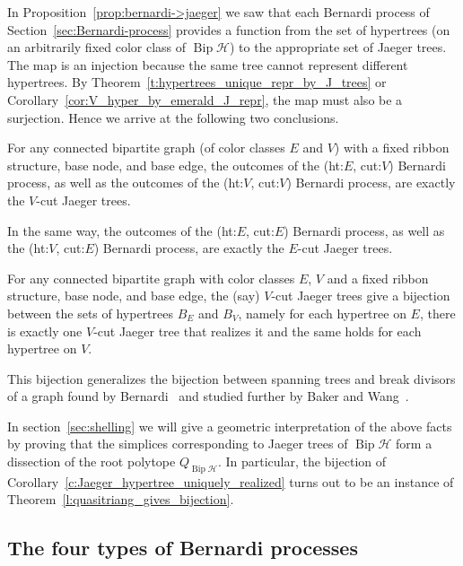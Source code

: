 \documentclass[ALCO,ThmDefs,Unicode,epreuves]{cedram}
\newcommand{\HH}{\mathcal H}
\DeclareMathOperator{\bip}{Bip}
\begin{document}
In Proposition~\ref{prop:bernardi->jaeger} we saw that each Bernardi process of Section~\ref{sec:Bernardi-process} provides a function from the set of hypertrees (on an arbitrarily fixed color class of $\bip\HH$) to the appropriate set of Jaeger trees. The map is an injection because the same tree cannot represent different hypertrees. By Theorem~\ref{t:hypertrees_unique_repr_by_J_trees} or Corollary~\ref{cor:V_hyper_by_emerald_J_repr}, the map must also be a surjection. Hence we arrive at the following two conclusions.

\begin{theo}\label{t:J-trees_are_B-trees}
For any connected bipartite graph (of color classes $E$ and $V$) with a fixed ribbon structure, base node, and base edge, the outcomes of the (ht:$E$, cut:$V$) Bernardi process, as well as the outcomes of the (ht:$V$, cut:$V$) Bernardi process, are exactly the $V$-cut Jaeger trees.
	
In the same way, the outcomes of the (ht:$E$, cut:$E$) Bernardi process, as well as the (ht:$V$, cut:$E$) Bernardi process, are exactly the $E$-cut Jaeger trees.
\end{theo}

\begin{coro} 
\label{c:Jaeger_hypertree_uniquely_realized}
	For any connected bipartite graph with color classes $E$, $V$ and a fixed ribbon structure, base node, and base edge, the (say) $V$-cut Jaeger trees give a bijection between the sets of hypertrees $B_{E}$ and $B_{V}$, namely for each hypertree on $E$, there is exactly one $V$-cut Jaeger tree that realizes it and the same holds for each hypertree on $V$.
\end{coro}

This bijection generalizes the bijection between spanning trees and break divisors of a graph found by Bernardi~\cite{Bernardi_Tutte} and studied further by Baker and Wang~\cite{Baker-Wang}.

In section~\ref{sec:shelling} we will give a geometric interpretation of the above facts by proving that the simplices corresponding to Jaeger trees of $\bip\HH$ form a dissection of the root polytope $Q_{\bip\HH}$. In particular, the bijection of Corollary~\ref{c:Jaeger_hypertree_uniquely_realized} turns out to be an instance of Theorem~\ref{l:quasitriang_gives_bijection}.


\subsection{The four types of Bernardi processes}
\label{subs:four_Bernardi}
\end{document}
